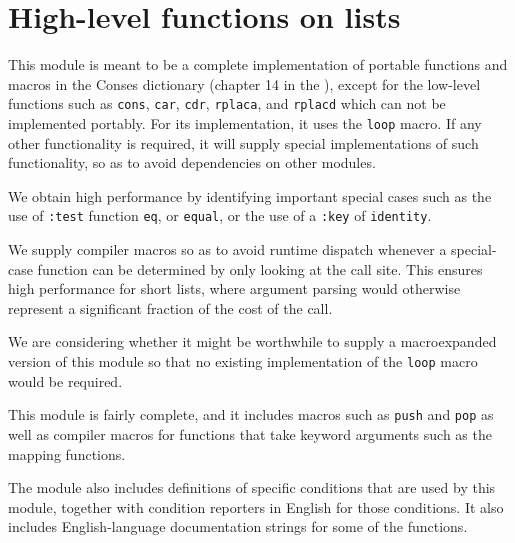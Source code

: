 \chapter{High-level functions on lists}

This module is meant to be a complete implementation of portable
functions and macros in the Conses dictionary (chapter 14 in the
\hs{}), except for the low-level functions such as \texttt{cons},
\texttt{car}, \texttt{cdr}, \texttt{rplaca}, and \texttt{rplacd} which
can not be implemented portably.  For its implementation, it uses the
\texttt{loop} macro.  If any other functionality is required, it will
supply special implementations of such functionality, so as to avoid
dependencies on other modules.

We obtain high performance by identifying important special
cases such as the use of \texttt{:test} function \texttt{eq}, or
\texttt{equal}, or the use of a \texttt{:key} of \texttt{identity}.

We supply compiler macros so as to avoid runtime dispatch whenever a
special-case function can be determined by only looking at the call
site.  This ensures high performance for short lists, where argument
parsing would otherwise represent a significant fraction of the cost
of the call.

We are considering whether it might be worthwhile to supply a
macroexpanded version of this module so that no existing
implementation of the \texttt{loop} macro would be required. 

This module is fairly complete, and it includes macros such as
\texttt{push} and \texttt{pop} as well as compiler macros for
functions that take keyword arguments such as the mapping functions. 

The module also includes definitions of specific conditions that are
used by this module, together with condition reporters in English for
those conditions.  It also includes English-language documentation
strings for some of the functions. 
